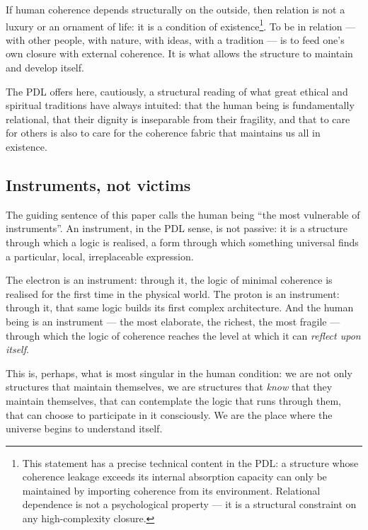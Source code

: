 \documentclass[12pt, a4paper, openright]{book}
\begin{document}
If human coherence depends structurally on the outside, then relation is not a luxury or an ornament of life: it is a condition of existence\footnote{This statement has a precise technical content in the PDL: a structure whose coherence leakage exceeds its internal absorption capacity can only be maintained by importing coherence from its environment. Relational dependence is not a psychological property — it is a structural constraint on any high-complexity closure.}. To be in relation — with other people, with nature, with ideas, with a tradition — is to feed one’s own closure with external coherence. It is what allows the structure to maintain and develop itself.

\medskip

The PDL offers here, cautiously, a structural reading of what great ethical and spiritual traditions have always intuited: that the human being is fundamentally relational, that their dignity is inseparable from their fragility, and that to care for others is also to care for the coherence fabric that maintains us all in existence.

\subsection*{Instruments, not victims}

The guiding sentence of this paper calls the human being “the most vulnerable of instruments”. An instrument, in the PDL sense, is not passive: it is a structure through which a logic is realised, a form through which something universal finds a particular, local, irreplaceable expression.

\medskip

The electron is an instrument: through it, the logic of minimal coherence is realised for the first time in the physical world. The proton is an instrument: through it, that same logic builds its first complex architecture. And the human being is an instrument — the most elaborate, the richest, the most fragile — through which the logic of coherence reaches the level at which it can \emph{reflect upon itself}.

\medskip

This is, perhaps, what is most singular in the human condition: we are not only structures that maintain themselves, we are structures that \emph{know} that they maintain themselves, that can contemplate the logic that runs through them, that can choose to participate in it consciously. We are the place where the universe begins to understand itself.
\end{document}
